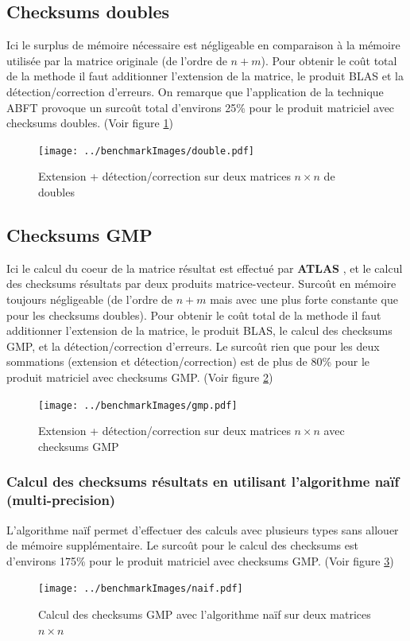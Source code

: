 \documentclass[a4paper, 10pt]{report}
\begin{document}
\subsection{Checksums doubles}
Ici le surplus de mémoire nécessaire est négligeable en comparaison à la mémoire utilisée par la matrice originale (de l'ordre de $n + m$).\newline
Pour obtenir le co\^ut total de la methode il faut additionner l'extension de la matrice, le produit BLAS et la détection/correction d'erreurs.\newline
On remarque que l'application de la technique ABFT \cite{Huang} provoque un surcoût total d'environs 25\% pour le produit matriciel avec checksums doubles.\newline
(Voir figure \ref{fig:double})
\begin{figure}
\center
\texttt{[image: ../benchmarkImages/double.pdf]}
\caption{Extension + détection/correction sur deux matrices $n \times n$ de doubles}
\label{fig:double}
\end{figure}

\subsection{Checksums \textbf{GMP} \cite{GMP}}
Ici le calcul du coeur de la matrice résultat est effectué par \textbf{ATLAS} \cite{ATLAS},
et le calcul des checksums résultats par deux produits matrice-vecteur.
Surco\^ut en mémoire toujours négligeable (de l'ordre de $n + m$ mais avec une plus forte constante que pour les checksums doubles).\newline
Pour obtenir le co\^ut total de la methode il faut additionner l'extension de la matrice, le produit BLAS, le calcul des checksums GMP, et la détection/correction d'erreurs.\newline
Le surcoût rien que pour les deux sommations (extension et détection/correction) est de plus de 80\% pour le produit matriciel avec checksums GMP.\newline
(Voir figure \ref{fig:gmp})
\begin{figure}
\center
\texttt{[image: ../benchmarkImages/gmp.pdf]}
\caption{Extension + détection/correction sur deux matrices $n \times n$ avec checksums GMP}
\label{fig:gmp}
\end{figure}

\subsubsection{Calcul des checksums résultats en utilisant l'algorithme naïf (multi-precision)}
L'algorithme naïf  permet d'effectuer des calculs avec plusieurs types sans allouer de mémoire supplémentaire.\newline
Le surcoût pour le calcul des checksums est d'environs 175\% pour le produit matriciel avec checksums GMP.\newline
(Voir figure \ref{fig:naif})
\begin{figure}
\center
\texttt{[image: ../benchmarkImages/naif.pdf]}
\caption{Calcul des checksums GMP avec l'algorithme naïf sur deux matrices $n \times n$}
\label{fig:naif}
\end{figure}
\end{document}
